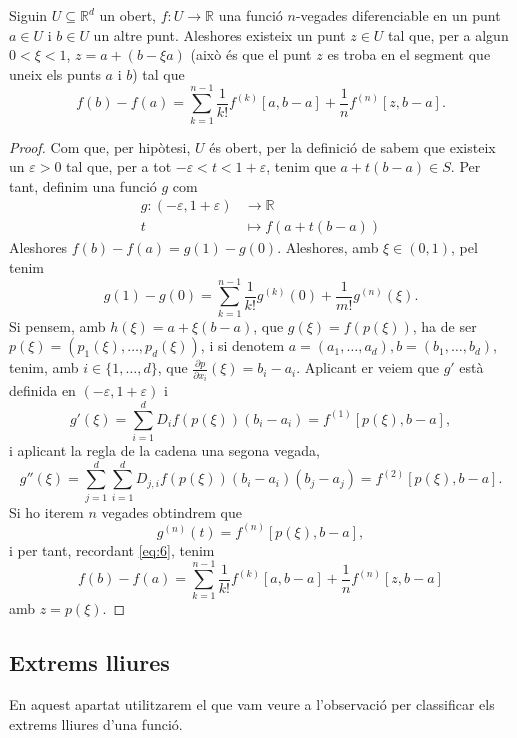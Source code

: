\documentclass[../Apunts.tex]{subfiles}
\begin{document}
	\begin{theorem}
		\label{thm:Formula de Taylor multivariable}
		Siguin \(U\subseteq\mathbb{R}^{d}\) un obert, \(f\colon U\to\mathbb{R}\) una funció \(n\)-vegades diferenciable en un punt \(a\in U\) i \(b\in U\) un altre punt. Aleshores existeix un punt \(z\in U\) tal que, per a algun \(0<\xi<1\), \(z=a+(b-\xi a)\) (això és que el punt \(z\) es troba en el segment que uneix els punts \(a\) i \(b\)) tal que
		\[f(b)-f(a)=\sum_{k=1}^{n-1}\frac{1}{k!}f^{(k)}[a,b-a]+\frac{1}{n}f^{(n)}[z,b-a].\]
		\begin{proof}
			Com que, per hipòtesi, \(U\) és obert, per la definició de  sabem que existeix un \(\varepsilon>0\) tal que, per a tot \(-\varepsilon<t<1+\varepsilon\), tenim que \(a+t(b-a)\in S\). Per tant, definim una funció \(g\) com
			\begin{align*}
			g\colon(-\varepsilon,1+\varepsilon)&\to\mathbb{R}\\
			t&\mapsto f(a+t(b-a))
			\end{align*}
			Aleshores \(f(b)-f(a)=g(1)-g(0)\). Aleshores, amb \(\xi\in(0,1)\), pel  tenim
			\begin{equation}\label{eq:6}
			g(1)-g(0)=\sum_{k=1}^{n-1}\frac{1}{k!}g^{(k)}(0)+\frac{1}{m!}g^{(n)}(\xi).
			\end{equation}
			Si pensem, amb \(h(\xi)=a+\xi(b-a)\), que \(g(\xi)=f(p(\xi))\), ha de ser \(p(\xi)=(p_{1}(\xi),\dots,p_{d}(\xi))\), i si denotem \(a=(a_{1},\dots,a_{d}),b=(b_{1},\dots,b_{d})\), tenim, amb \(i\in\{1,\dots,d\}\), que \(\frac{\partial p}{\partial x_{i}}(\xi)=b_{i}-a_{i}\). Aplicant er  veiem que \(g'\) està definida en \((-\varepsilon,1+\varepsilon)\) i
			\[g'(\xi)=\sum_{i=1}^{d}D_{i}f(p(\xi))(b_{i}-a_{i})=f^{(1)}[p(\xi),b-a],\]
			i aplicant la regla de la cadena una segona vegada,
			\[g''(\xi)=\sum_{j=1}^{d}\sum_{i=1}^{d}D_{j,i}f(p(\xi))(b_{i}-a_{i})(b_{j}-a_{j})=f^{(2)}[p(\xi),b-a].\]
			Si ho iterem \(n\) vegades obtindrem que
			\[g^{(n)}(t)=f^{(n)}[p(\xi),b-a],\]
			i per tant, recordant \eqref{eq:6}, tenim
			\[f(b)-f(a)=\sum_{k=1}^{n-1}\frac{1}{k!}f^{(k)}[a,b-a]+\frac{1}{n}f^{(n)}[z,b-a]\]
			amb \(z=p(\xi)\).
		\end{proof}
	\end{theorem}
	\subsection{Extrems lliures}\label{sec:Classificar extrems lliures}
	En aquest apartat utilitzarem el que vam veure a l'observació  per classificar els extrems lliures d'una funció.
	
\end{document}
